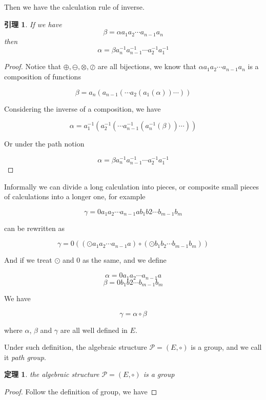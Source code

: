 \documentclass[a4paper,12pt]{article}
\numberwithin{definition}{section}
\newtheorem{lemma}{引理}
\numberwithin{lemma}{section}
\numberwithin{proposition}{section}
\newtheorem{theorem}{定理}
\numberwithin{theorem}{section}
\numberwithin{grammar}{section}
\numberwithin{program}{section}
\numberwithin{convention}{section}
\numberwithin{corollary}{section}
\begin{document}
Then we have the calculation rule of inverse.

\begin{lemma}
\label{lemma:inverserule}
If we have
$$\beta = \alpha a_1 a_2 \cdots a_{n-1} a_n$$
then
$$\alpha = \beta a_n^{-1} a_{n-1}^{-1} \cdots a_2^{-1} a_1^{-1}$$
\end{lemma}

\begin{proof}
Notice that $\oplus, \ominus, \otimes, \oslash$ are all bijections, we know that $\alpha a_1 a_2 \cdots a_{n-1} a_n$ is a composition of functions

$$\beta = a_n( a_{n-1}( \cdots a_2( a_1(\alpha) ) \cdots ) )$$

Considering the inverse of a composition, we have

$$\alpha = a_1^{-1}( a_2^{-1}( \cdots a_{n-1}^{-1}( a_n^{-1}(\beta) ) \cdots ) )$$

Or under the path notion

$$\alpha = \beta a_n^{-1} a_{n-1}^{-1} \cdots a_2^{-1} a_1^{-1}$$

\qedhere
\end{proof}

Informally we can divide a long calculation into pieces, or composite small pieces of calculations into a longer one,
for example

$$\gamma = 0 a_1 a_2 \cdots a_{n-1} a b_1 b2 \cdots b_{m-1} b_m$$

can be rewritten as

$$\gamma = 0 ((\odot a_1 a_2 \cdots a_{n-1} a) \circ (\odot b_1 b_2 \cdots b_{m-1} b_m))$$

And if we treat $\odot$ and $0$ as the same, and we define

$$\alpha = 0 a_1 a_2 \cdots a_{n-1} a$$
$$\beta = 0 b_1 b2 \cdots b_{m-1} b_m$$

We have

$$\gamma = \alpha \circ \beta$$

where $\alpha$, $\beta$ and $\gamma$ are all well defined in $E$.

Under such definition, the algebraic structure $\mathcal{P} = (E, \circ)$ is a group, and we call it \emph{path group}.

\begin{theorem}
\label{theorem:pathgroup}
the algebraic structure $\mathcal{P} = (E, \circ)$ is a group
\end{theorem}

\begin{proof}
    Follow the definition of group, we have
\qedhere
\end{proof}
\end{document}
